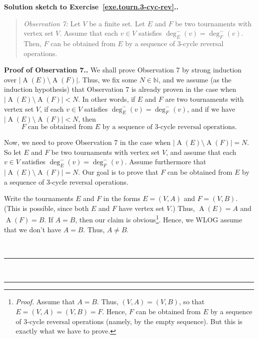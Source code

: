 \documentclass[numbers=enddot,12pt,final,onecolumn,notitlepage]{scrartcl}%
\theoremstyle{definition}
\newenvironment{statement}{\begin{quote}}{\end{quote}}
\newenvironment{proof}[1][Proof]{\noindent\textbf{#1.} }{\ \rule{0.5em}{0.5em}}
\newcommand{\NN}{\mathbb{N}}
\newcommand{\abs}[1]{\left| #1 \right|}
\newcommand{\tup}[1]{\left( #1 \right)}
\newcommand{\arcs}[1]{\operatorname{A}\left( #1 \right)}
\begin{document}
\begin{proof}[Solution sketch to Exercise~\ref{exe.tourn.3-cyc-rev}.]
\begin{statement}
\textit{Observation 7:} Let $V$ be a finite set. Let $E$ and $F$ be
two tournaments with vertex set $V$. Assume that
each $v \in V$ satisfies $\deg^-_E \tup{v} = \deg^-_F \tup{v}$.
Then, $F$ can be obtained
from $E$ by a sequence of $3$-cycle reversal operations.
\end{statement}

\begin{proof}[Proof of Observation 7.]
We shall prove Observation 7 by strong induction over
$\abs{\arcs{E} \setminus \arcs{F}}$. Thus, we fix some $N \in \NN$,
and we assume (as the induction hypothesis) that Observation 7 is
already proven in the case when
$\abs{\arcs{E} \setminus \arcs{F}} < N$. In other words, if $E$ and
$F$ are two tournaments with vertex set $V$, if each $v \in V$
satisfies $\deg^-_E \tup{v} = \deg^-_F \tup{v}$, and if we have
$\abs{\arcs{E} \setminus \arcs{F}} < N$, then
\begin{equation}
F \text{ can be obtained from } E
\text{ by a sequence of }3\text{-cycle reversal operations}.
\label{sol.tourn.3-cyc-rev.o7.pf.IH}
\end{equation}

Now, we need to prove Observation 7 in the case when
$\abs{\arcs{E} \setminus \arcs{F}} = N$.
So let $E$ and $F$ be two tournaments with vertex set $V$, and
assume that each $v \in V$ satisfies
$\deg^-_E \tup{v} = \deg^-_F \tup{v}$. Assume furthermore that
$\abs{\arcs{E} \setminus \arcs{F}} = N$.
Our goal is to prove that $F$ can be obtained
from $E$ by a sequence of $3$-cycle reversal operations.

Write the tournaments $E$ and $F$ in
the forms $E = \tup{V, A}$ and $F = \tup{V, B}$. (This is possible,
since both $E$ and $F$ have vertex set $V$.) Thus, $\arcs{E} = A$
and $\arcs{F} = B$.
If $A = B$, then
our claim is obvious\footnote{\textit{Proof.} Assume that
$A = B$. Thus, $\tup{V, A} = \tup{V, B}$, so that
$E = \tup{V, A} = \tup{V, B} = F$. Hence, $F$ can be obtained
from $E$ by a sequence of $3$-cycle reversal operations
(namely, by the empty sequence). But this is exactly what we have
to prove.}. Hence, we WLOG assume that we don't have $A = B$.
Thus, $A \neq B$.


\end{proof}
\end{proof}
\end{document}

